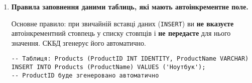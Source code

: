 \documentclass{article}
\begin{document}
\begin{enumerate}[label=\arabic*., leftmargin=*]
        \item \textbf{Правила заповнення даними таблиць, які мають автоінкрементне поле.}

        Основне правило: при звичайній вставці даних (\texttt{INSERT}) ви
        \textbf{не вказуєте} автоінкрементний стовпець у списку стовпців і
        \textbf{не передаєте} для нього значення. СКБД згенерує його
        автоматично.

        \begin{CodeBox}[Приклад]
        \begin{verbatim}
-- Таблиця: Products (ProductID INT IDENTITY, ProductName VARCHAR)
INSERT INTO Products (ProductName) VALUES ('Ноутбук'); 
-- ProductID буде згенеровано автоматично
        \end{verbatim}
        \end{CodeBox}
    \end{enumerate}
\end{document}
